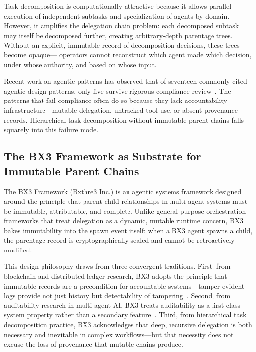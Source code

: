 Task decomposition is computationally attractive because it allows parallel execution of independent subtasks and specialization of agents by domain. However, it amplifies the delegation chain problem: each decomposed subtask may itself be decomposed further, creating arbitrary-depth parentage trees. Without an explicit, immutable record of decomposition decisions, these trees become opaque— operators cannot reconstruct which agent made which decision, under whose authority, and based on whose input.

Recent work on agentic patterns has observed that of seventeen commonly cited agentic design patterns, only five survive rigorous compliance review~\cite{poview_compliance}. The patterns that fail compliance often do so because they lack accountability infrastructure—mutable delegation, untracked tool use, or absent provenance records. Hierarchical task decomposition without immutable parent chains falls squarely into this failure mode.

\subsection{The BX3 Framework as Substrate for Immutable Parent Chains}

The BX3 Framework (Bxthre3 Inc.) is an agentic systems framework designed around the principle that parent-child relationships in multi-agent systems must be immutable, attributable, and complete. Unlike general-purpose orchestration frameworks that treat delegation as a dynamic, mutable runtime concern, BX3 bakes immutability into the spawn event itself: when a BX3 agent spawns a child, the parentage record is cryptographically sealed and cannot be retroactively modified.

This design philosophy draws from three convergent traditions. First, from blockchain and distributed ledger research, BX3 adopts the principle that immutable records are a precondition for accountable systems—tamper-evident logs provide not just history but detectability of tampering~\cite{blockchain_ai_audits, flexblok_blockchain}. Second, from auditability research in multi-agent AI, BX3 treats auditability as a first-class system property rather than a secondary feature~\cite{dl_acm_auditable}. Third, from hierarchical task decomposition practice, BX3 acknowledges that deep, recursive delegation is both necessary and inevitable in complex workflows—but that necessity does not excuse the loss of provenance that mutable chains produce.

